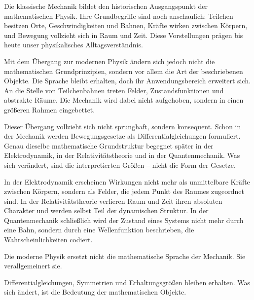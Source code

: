 Die klassische Mechanik bildet den historischen Ausgangspunkt der mathematischen Physik.
Ihre Grundbegriffe sind noch anschaulich:
Teilchen besitzen Orte, Geschwindigkeiten und Bahnen,
Kräfte wirken zwischen Körpern,
und Bewegung vollzieht sich in Raum und Zeit.
Diese Vorstellungen prägen bis heute unser physikalisches Alltagsverständnis.

Mit dem Übergang zur modernen Physik ändern sich jedoch nicht die mathematischen Grundprinzipien,
sondern vor allem die Art der beschriebenen Objekte.
Die Sprache bleibt erhalten,
doch ihr Anwendungsbereich erweitert sich.
An die Stelle von Teilchenbahnen treten Felder,
Zustandsfunktionen und abstrakte Räume.
Die Mechanik wird dabei nicht aufgehoben,
sondern in einen größeren Rahmen eingebettet.

Dieser Übergang vollzieht sich nicht sprunghaft,
sondern konsequent.
Schon in der Mechanik werden Bewegungsgesetze
als Differentialgleichungen formuliert.
Genau dieselbe mathematische Grundstruktur begegnet später
in der Elektrodynamik,
in der Relativitätstheorie
und in der Quantenmechanik.
Was sich verändert,
sind die interpretierten Größen --
nicht die Form der Gesetze.

In der Elektrodynamik erscheinen Wirkungen nicht mehr
als unmittelbare Kräfte zwischen Körpern,
sondern als Felder,
die jedem Punkt des Raumes zugeordnet sind.
In der Relativitätstheorie verlieren Raum und Zeit ihren absoluten Charakter
und werden selbst Teil der dynamischen Struktur.
In der Quantenmechanik schließlich
wird der Zustand eines Systems nicht mehr durch eine Bahn,
sondern durch eine Wellenfunktion beschrieben,
die Wahrscheinlichkeiten codiert.

\begin{DidacticBox}
	\label{box:neuebegriffe}
	Die moderne Physik ersetzt nicht die mathematische Sprache der Mechanik.
	Sie verallgemeinert sie.
	
	Differentialgleichungen, Symmetrien
	und Erhaltungsgrößen
	bleiben erhalten.
	Was sich ändert,
	ist die Bedeutung der mathematischen Objekte.
\end{DidacticBox}

